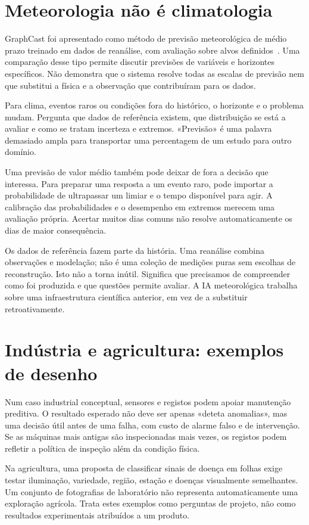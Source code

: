 \section{Meteorologia não é climatologia}
GraphCast foi apresentado como método de previsão meteorológica de médio prazo treinado em dados de reanálise, com avaliação sobre alvos definidos~\citep{graphcast2023}. Uma comparação desse tipo permite discutir previsões de variáveis e horizontes específicos. Não demonstra que o sistema resolve todas as escalas de previsão nem que substitui a física e a observação que contribuíram para os dados.

Para clima, eventos raros ou condições fora do histórico, o horizonte e o problema mudam. Pergunta que dados de referência existem, que distribuição se está a avaliar e como se tratam incerteza e extremos. «Previsão» é uma palavra demasiado ampla para transportar uma percentagem de um estudo para outro domínio.

Uma previsão de valor médio também pode deixar de fora a decisão que interessa. Para preparar uma resposta a um evento raro, pode importar a probabilidade de ultrapassar um limiar e o tempo disponível para agir. A calibração das probabilidades e o desempenho em extremos merecem uma avaliação própria. Acertar muitos dias comuns não resolve automaticamente os dias de maior consequência.

Os dados de referência fazem parte da história. Uma reanálise combina observações e modelação; não é uma coleção de medições puras sem escolhas de reconstrução. Isto não a torna inútil. Significa que precisamos de compreender como foi produzida e que questões permite avaliar. A IA meteorológica trabalha sobre uma infraestrutura científica anterior, em vez de a substituir retroativamente.

\section{Indústria e agricultura: exemplos de desenho}
Num caso industrial conceptual, sensores e registos podem apoiar manutenção preditiva. O resultado esperado não deve ser apenas «deteta anomalias», mas uma decisão útil antes de uma falha, com custo de alarme falso e de intervenção. Se as máquinas mais antigas são inspecionadas mais vezes, os registos podem refletir a política de inspeção além da condição física.

Na agricultura, uma proposta de classificar sinais de doença em folhas exige testar iluminação, variedade, região, estação e doenças visualmente semelhantes. Um conjunto de fotografias de laboratório não representa automaticamente uma exploração agrícola. Trata estes exemplos como perguntas de projeto, não como resultados experimentais atribuídos a um produto.

